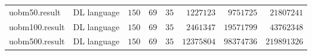 \documentclass{llncs}
\begin{document}
\begin{table*}[tb]
\begin{center}
\begin{tabular}{|l|l|l| r| r| r| r  || r |}
uobm50.result & DL language  &$150$  &$69$  &$35$  &$1227123$  &$9751725$  &$21807241$   \\ 

uobm100.result & DL language  &$150$  &$69$  &$35$  &$2461347$  &$19571799$  &$43762348$   \\ 

uobm500.result & DL language  &$150$  &$69$  &$35$  &$12375804$  &$98374736$  &$219891326$   \\ 

\hline
      \end{tabular}
    \end{center}

\end{table*}
\end{document}
